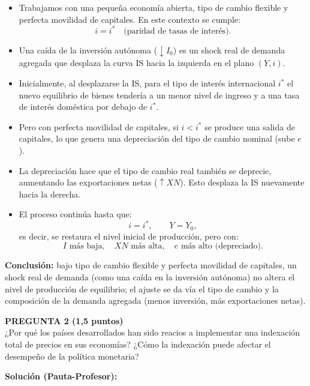 \documentclass[11pt,addpoints]{article}
\begin{document}
\begin{itemize}
  \item Trabajamos con una pequeña economía abierta, tipo de cambio flexible y perfecta movilidad de capitales. En este contexto se cumple:
  \[
    i = i^* \quad \text{(paridad de tasas de interés)}.
  \]
  \item Una caída de la inversión autónoma ($\downarrow I_0$) es un shock real de demanda agregada que desplaza la curva IS hacia la izquierda en el plano $(Y,i)$.
  \item Inicialmente, al desplazarse la IS, para el tipo de interés internacional $i^*$ el nuevo equilibrio de bienes tendería a un menor nivel de ingreso y a una tasa de interés doméstica por debajo de $i^*$.
  \item Pero con perfecta movilidad de capitales, si $i < i^*$ se produce una salida de capitales, lo que genera una depreciación del tipo de cambio nominal (sube $e$).
  \item La depreciación hace que el tipo de cambio real también se deprecie, aumentando las exportaciones netas ($\uparrow XN$). Esto desplaza la IS nuevamente hacia la derecha.
  \item El proceso continúa hasta que:
  \[
    i = i^*, \qquad Y = Y_0,
  \]
  es decir, se restaura el nivel inicial de producción, pero con:
  \[
    I \text{ más baja}, \quad XN \text{ más alta}, \quad e \text{ más alto (depreciado)}.
  \]
\end{itemize}

\textbf{Conclusión:} bajo tipo de cambio flexible y perfecta movilidad de capitales, un shock real de demanda (como una caída en la inversión autónoma) no altera el nivel de producción de equilibrio; el ajuste se da vía el tipo de cambio y la composición de la demanda agregada (menos inversión, más exportaciones netas).

\vspace{0.4cm}

\textbf{PREGUNTA 2 (1,5 puntos)}\\[0.2cm]
¿Por qué los países desarrollados han sido reacios a implementar una indexación total de precios en sus economías? ¿Cómo la indexación puede afectar el desempeño de la política monetaria?

\vspace{0.2cm}
\textbf{Solución (Pauta-Profesor):}
\end{document}
